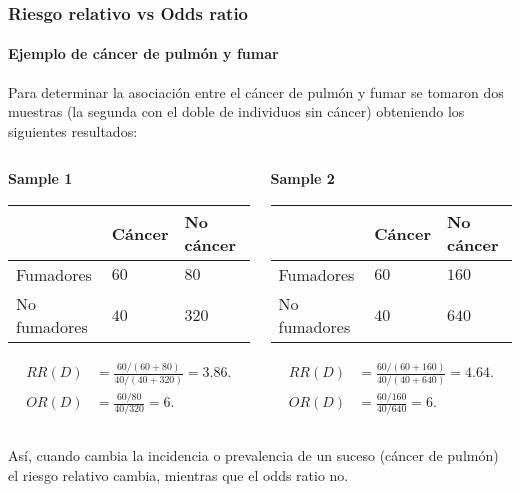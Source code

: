 \begin{frame}
\frametitle{Riesgo relativo vs Odds ratio}
\framesubtitle{Ejemplo de cáncer de pulmón y fumar}
Para determinar la asociación entre el cáncer de pulmón y fumar se tomaron dos muestras (la segunda con el doble de individuos sin cáncer) obteniendo los siguientes resultados:

\bigskip
\begin{columns}
\begin{column}{0.5\textwidth}
\textbf{Sample 1}
\begin{center}
\small
\begin{tabular}{|m{1.9cm}|m{1.2cm}<{\centering}|m{1.5cm}<{\centering}|}
\cline{2-3}
\multicolumn{1}{c|}{} & Cáncer & No cáncer\\ 
\hline
Fumadores & $60$ & $80$\\ 
\hline 
No fumadores & $40$ & $320$\\ 
\hline
\end{tabular}
\end{center}

\begin{align*}
RR(D) &= \frac{60/(60+80)}{40/(40+320)} = 3.86.\\
OR(D) &= \frac{60/80}{40/320} = 6. 
\end{align*}
\end{column}
\begin{column}{0.5\textwidth}
\textbf{Sample 2}
\begin{center}
\small
\begin{tabular}{|m{1.9cm}|m{1.2cm}<{\centering}|m{1.5cm}<{\centering}|}
\cline{2-3}
\multicolumn{1}{c|}{} & Cáncer & No cáncer\\ 
\hline
Fumadores & $60$ & $160$\\ 
\hline 
No fumadores & $40$ & $640$\\ 
\hline
\end{tabular}
\end{center}

\begin{align*}
RR(D) &= \frac{60/(60+160)}{40/(40+640)} = 4.64.\\
OR(D) &= \frac{60/160}{40/640} = 6. 
\end{align*}
\end{column}
\end{columns}
Así, cuando cambia la incidencia o prevalencia de un suceso (cáncer de pulmón) el riesgo relativo cambia, mientras que el odds ratio no.
\end{frame}


